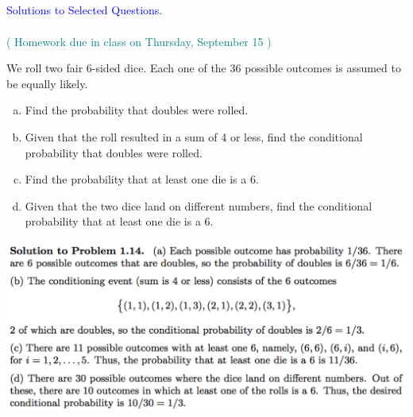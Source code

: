 \documentclass[12pt]{article}
\newenvironment{question}[2][Question]{\begin{trivlist}
\item[\hskip \labelsep {\bfseries #1}\hskip \labelsep {\bfseries #2.}]}{\end{trivlist}}
\begin{document}
\subsection*{}
\centering\textcolor{blue}{Solutions to Selected Questions. \\}
\centering\textcolor{teal}{\\ ( Homework due in class on Thursday, September 15 )}
\vspace{5mm}


 \begin{question}{1} We roll two fair 6-sided dice. Each one of the 36 possible outcomes is
assumed to be equally likely.
\begin{enumerate}[(a)]
 \item  Find the probability that doubles were rolled.
\item  Given that the roll resulted in a sum of 4 or less, find the conditional probability
that doubles were rolled.
 \item Find the probability that at least one die is a 6.
 \item Given that the two dice land on different numbers, find the conditional probability
that at least one die is a 6.
 \end{enumerate}

\end{question} 

\includegraphics[scale=0.6]{Answer1}

\vspace{5mm}
\end{document}
